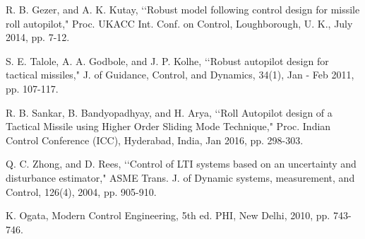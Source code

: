 \documentclass[conference]{IEEEtran}
\begin{document}
\begin{thebibliography}{1}
R. B. Gezer, and A. K. Kutay, \lq \lq Robust model following control design for missile roll autopilot," Proc. UKACC Int. Conf. on Control, Loughborough,  U. K., July 2014, pp. 7-12.

S. E. Talole, A. A. Godbole, and J. P. Kolhe, \lq \lq Robust autopilot design for tactical missiles," J. of Guidance, Control, and Dynamics, 34(1), Jan - Feb 2011, pp. 107-117.

R. B. Sankar, B. Bandyopadhyay, and H. Arya, \lq \lq Roll Autopilot design of a Tactical Missile using Higher Order Sliding Mode Technique," Proc.  Indian Control Conference (ICC), Hyderabad, India, Jan 2016, pp. 298-303.

Q. C. Zhong, and D. Rees, \lq \lq Control of LTI systems based on an uncertainty and disturbance estimator," ASME Trans. J. of Dynamic systems, measurement, and Control, 126(4), 2004, pp. 905-910.

K. Ogata, Modern Control Engineering, 5th ed. PHI, New Delhi, 2010, pp. 743-746.

\end{thebibliography}




\end{document}
